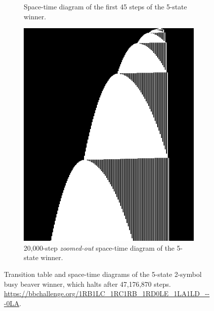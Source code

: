 \begin{figure}[ht]
\begin{subfigure}[b]{0.3\textwidth}
        \caption{Space-time diagram of the first 45 steps of the 5-state winner.}
        \label{fig:bb5-diagram}
    \end{subfigure}
    \hfill
    \begin{subfigure}[b]{0.3\textwidth}
        \centering
        \includegraphics[width=\linewidth]{figures/space-time-diagrams/bb5_20k.png}
        \caption{20,000-step \textit{zoomed-out} space-time diagram of the 5-state winner.}\label{fig:bb5-diagram-zoomout}
    \end{subfigure}

    \caption{Transition table and space-time diagrams of the 5-state 2-symbol busy beaver winner, which halts after 47,176,870 steps.
        \url{https://bbchallenge.org/1RB1LC_1RC1RB_1RD0LE_1LA1LD_---0LA}.}\label{fig:bb5win}
\end{figure}






